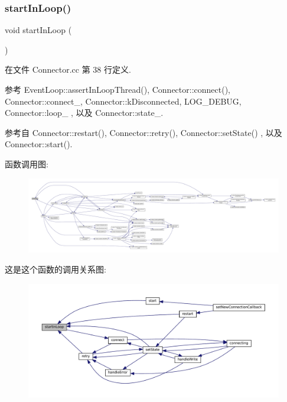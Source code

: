 \subsubsection{\texorpdfstring{start\+In\+Loop()}{startInLoop()}}
{\footnotesize\ttfamily void start\+In\+Loop (\begin{DoxyParamCaption}{ }\end{DoxyParamCaption})\hspace{0.3cm}{\ttfamily [private]}}



在文件 Connector.\+cc 第 38 行定义.



参考 Event\+Loop\+::assert\+In\+Loop\+Thread(), Connector\+::connect(), Connector\+::connect\+\_\+, Connector\+::k\+Disconnected, L\+O\+G\+\_\+\+D\+E\+B\+UG, Connector\+::loop\+\_\+ , 以及 Connector\+::state\+\_\+.



参考自 Connector\+::restart(), Connector\+::retry(), Connector\+::set\+State() , 以及 Connector\+::start().

函数调用图\+:
\nopagebreak
\begin{figure}[H]
\begin{center}
\leavevmode
\includegraphics[width=350pt]{classmuduo_1_1Connector_ad289b54db652dcb10f835f3613e68fdb_cgraph}
\end{center}
\end{figure}
这是这个函数的调用关系图\+:
\nopagebreak
\begin{figure}[H]
\begin{center}
\leavevmode
\includegraphics[width=350pt]{classmuduo_1_1Connector_ad289b54db652dcb10f835f3613e68fdb_icgraph}
\end{center}
\end{figure}
\mbox{\label{classmuduo_1_1Connector_a8c528baf37154d347366083f0f816846}} 
